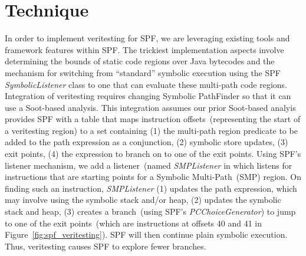 \section{Technique}
In order to implement veritesting for SPF, we are leveraging existing tools and framework features within SPF.  The
trickiest implementation aspects involve determining the bounds of static code regions over Java bytecodes and the
mechanism for switching from ``standard'' symbolic execution using the SPF {\em SymbolicListener} class to one that can
evaluate these multi-path code regions.
%
Integration of veritesting requires changing Symbolic PathFinder so that it can
use a Soot-based analysis.
%
This integration assumes our prior Soot-based analyis provides SPF
with a table that maps instruction offsets~(representing the start of a
veritesting region) to a set containing (1) the multi-path region predicate to be
added to the path expression as a conjunction, (2) symbolic store
updates, (3) exit points, (4) the expression to branch on to one of the exit points.
%
Using SPF\rq s listener mechanism, we add a listener~(named
\textit{SMPListener} in which listens for instructions that are starting points for a Symbolic Multi-Path~(SMP) region.
%
On finding such an instruction, \textit{SMPListener}
(1) updates the path expression, which may involve using the symbolic stack and/or heap,
(2) updates the symbolic stack and heap,
(3) creates a branch~(using SPF's \textit{PCChoiceGenerator}) to
jump to one of the exit points~(which are instructions at offsets 40 and
41 in Figure~\ref{fig:spf_veritesting}).
%
SPF will then continue plain symbolic execution.
%
Thus, veritesting causes SPF to explore fewer branches.
%
%
